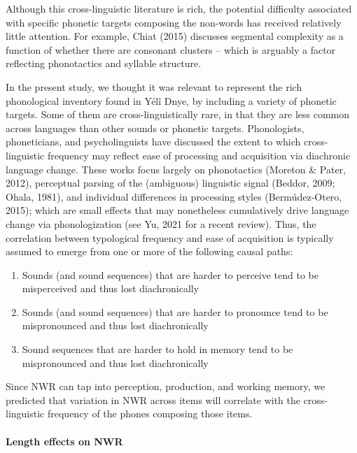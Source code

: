 \documentclass[
  american,
  ,man,floatsintext]{apa6}
\providecommand{\tightlist}{%
  \setlength{\itemsep}{0pt}\setlength{\parskip}{0pt}}
\let\oldparagraph\paragraph
\renewcommand{\paragraph}[1]{\oldparagraph{#1}\mbox{}}
\begin{document}
Although this cross-linguistic literature is rich, the potential difficulty associated with specific phonetic targets composing the non-words has received relatively little attention. For example, Chiat (2015) discusses segmental complexity as a function of whether there are consonant clusters -- which is arguably a factor reflecting phonotactics and syllable structure.

In the present study, we thought it was relevant to represent the rich phonological inventory found in Yélî Dnye, by including a variety of phonetic targets. Some of them are cross-linguistically rare, in that they are less common across languages than other sounds or phonetic targets. Phonologists, phoneticians, and psycholinguists have discussed the extent to which cross-linguistic frequency may reflect ease of processing and acquisition via diachronic language change. These works focus largely on phonotactics (Moreton \& Pater, 2012), perceptual parsing of the (ambiguous) linguistic signal (Beddor, 2009; Ohala, 1981), and individual differences in processing styles (Bermúdez-Otero, 2015); which are small effects that may nonetheless cumulatively drive language change via phonologization (see Yu, 2021 for a recent review). Thus, the correlation between typological frequency and ease of acquisition is typically assumed to emerge from one or more of the following causal paths:

\begin{enumerate}
\def\labelenumi{\arabic{enumi}.}
\tightlist
\item
  Sounds (and sound sequences) that are harder to perceive tend to be misperceived and thus lost diachronically
\item
  Sounds (and sound sequences) that are harder to pronounce tend to be mispronounced and thus lost diachronically
\item
  Sound sequences that are harder to hold in memory tend to be mispronounced and thus lost diachronically
\end{enumerate}

Since NWR can tap into perception, production, and working memory, we predicted that variation in NWR across items will correlate with the cross-linguistic frequency of the phones composing those items.

\hypertarget{length-effects-on-nwr}{%
\paragraph{Length effects on NWR}\label{length-effects-on-nwr}}
\end{document}
